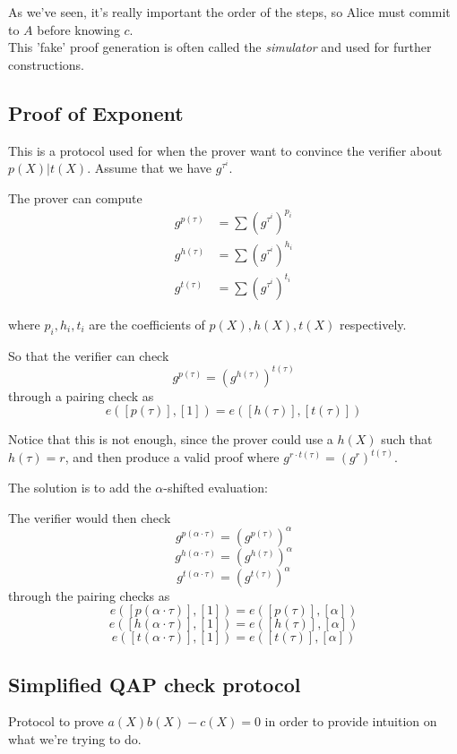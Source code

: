 \documentclass{article}
\begin{document}
As we've seen, it's really important the order of the steps, so Alice must commit to $A$ before knowing $c$.\\
This 'fake' proof generation is often called the \emph{simulator} and used for further constructions.

\vspace{1.0cm}
\subsection{Proof of Exponent}
This is a protocol used for when the prover want to convince the verifier about $p(X)|t(X)$. Assume that we have $g^{\tau^i}$.

The prover can compute
\begin{align*}
    g^{p(\tau)} &= \sum (g^{\tau^i})^{p_i}\\
    g^{h(\tau)} &= \sum (g^{\tau^i})^{h_i}\\
    g^{t(\tau)} &= \sum (g^{\tau^i})^{t_i}
\end{align*}

where $p_i, h_i, t_i$ are the coefficients of $p(X), h(X), t(X)$ respectively.

So that the verifier can check
$$g^{p(\tau)}=(g^{h(\tau)})^{t(\tau)}$$
through a pairing check as
$$e([p(\tau)], [1])=e([h(\tau)], [t(\tau)])$$

Notice that this is not enough, since the prover could use a $h(X)$ such that $h(\tau)=r$, and then produce a valid proof where $g^{r \cdot t(\tau)} = (g^r)^{t(\tau)}$.

The solution is to add the $\alpha$-shifted evaluation:

The verifier would then check
$$g^{p(\alpha \cdot \tau)} = (g^{p(\tau)})^\alpha$$
$$g^{h(\alpha \cdot \tau)} = (g^{h(\tau)})^\alpha$$
$$g^{t(\alpha \cdot \tau)} = (g^{t(\tau)})^\alpha$$
through the pairing checks as
$$e([p(\alpha \cdot \tau)], [1])=e([p(\tau)], [\alpha])$$
$$e([h(\alpha \cdot \tau)], [1])=e([h(\tau)], [\alpha])$$
$$e([t(\alpha \cdot \tau)], [1])=e([t(\tau)], [\alpha])$$

\vspace{0.5cm}

\vspace{1.0cm}
\subsection{Simplified QAP check protocol}
Protocol to prove $a(X)b(X)-c(X)=0$ in order to provide intuition on what we're trying to do.
\end{document}

